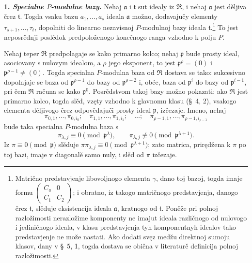\documentclass[11pt]{article}
\begin{document}
\setcounter{footnote}{26}

\textbf{1. \emph{Specialne $P$-modulne bazy.}} Nehaj $\mathfrak a$ i $\mathfrak t$ sut idealy iz $\mathfrak R$, i nehaj $\mathfrak a$ jest děljiva črez $\mathfrak t$. Togda vsaku bazu $a_1,\ldots,a_s$ ideala $\mathfrak a$ možno, dodavajučy elementy $\tau_{s+1},\ldots,\tau_t$, dopolniti do linearno nezavisnoj $P$-modulnoj bazy ideala $\mathfrak t$.\footnote{Matrično predstavjenje libovoljnogo elementa $\gamma$, dano toj bazoj, togda imaje formu $\begin{pmatrix}C_{\mathfrak a}&0\\ C_1&C_2\end{pmatrix}$; i obratno, iz takogo matričnogo predstavjenja, danogo črez $\mathfrak t$, slěduje eksistencija ideala $\mathfrak a$, kratnogo od $\mathfrak t$. Poněže pri polnoj razložimosti nerazložime komponenty ne imajut ideala različnogo od nulovogo i jediničnogo ideala, v klasu predstavjenja tyh komponentnyh idealov tako predstavjenje ne može nastati. Ako dodati svęz medžu direktnoj sumoju klasov, dany v \S~5, 1, togda dostava se obična v literaturě definicija polnoj razložimosti.} To jest neposrědnji poslědok predpoloženogo konečnogo ranga vzhodno k polju $P$.

Nehaj teper $\mathfrak R$ predpolagaje se kako primarno kolco; nehaj $\mathfrak p$ bude prosty ideal, asociovany s nulovym idealom, a $\rho$ jego eksponent, to jest $\mathfrak p^\rho=(0)$ i $\mathfrak p^{\rho-1}\ne(0)$. Togda specialna $P$-modulna baza od $\mathfrak R$ dostava se tako: sukcesivno dopolnjaje se baza od $\mathfrak p^{\rho-1}$ do bazy od $\mathfrak p^{\rho-2}$ i, obće, baza od $\mathfrak p^i$ do bazy od $\mathfrak p^{i-1}$, pri čem $\mathfrak R$ računa se kako $\mathfrak p^0$. Posrědstvom takoj bazy možno pokazati: ako $\mathfrak R$ jest primarno kolco, togda slěd, vzęty vzhodno k glavnomu klasu (\S~4, 2), vsakogo elementa děljivogo črez odpovědajuči prosty ideal $\mathfrak p$, izčezaje. Imeno, nehaj
\[
\pi_{0,1},\ldots,\pi_{0,i_0};\quad
\pi_{1,1},\ldots,\pi_{1,i_1};\quad \ldots;\quad
\pi_{\rho-1,1},\ldots,\pi_{\rho-1,i_{\rho-1}}
\]
bude taka specialna $P$-modulna baza s
\[
\pi_{\lambda,j}\equiv0\pmod{\mathfrak p^\lambda},\qquad
\pi_{\lambda,j}\not\equiv0\pmod{\mathfrak p^{\lambda+1}}.
\]
Iz $\pi\equiv0\pmod{\mathfrak p}$ slěduje $\pi\pi_{\lambda,j}\equiv0\pmod{\mathfrak p^{\lambda+1}}$; zato matrica, prirędžena k $\pi$ po toj bazi, imaje v diagonalě samo nuly, i slěd od $\pi$ izčezaje.
\end{document}
